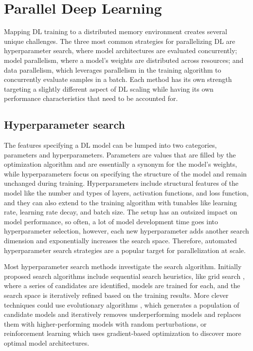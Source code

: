 \section{Parallel Deep Learning}
Mapping DL training to a distributed memory environment creates several unique challenges.
The three most common strategies for parallelizing DL are hyperparameter search, where model architectures are evaluated concurrently; model parallelism, where a model's weights are distributed across resources; and data parallelism, which leverages parallelism in the training algorithm to concurrently evaluate samples in a batch.
Each method has its own strength targeting a slightly different aspect of DL scaling while having its own performance characteristics that need to be accounted for.

\subsection{Hyperparameter search}
The features specifying a DL model can be lumped into two categories, parameters and hyperparameters.
Parameters are values that are filled by the optimization algorithm and are essentially a synonym for the model's weights, while hyperparameters focus on specifying the structure of the model and remain unchanged during training.
Hyperparameters include structural features of the model like the number and types of layers, activation functions, and loss function, and they can also extend to the training algorithm with tunables like learning rate, learning rate decay, and batch size.
The setup has an outsized impact on model performance, so often, a lot of model development time goes into hyperparameter selection, however, each new hyperparameter adds another search dimension and exponentially increases the search space.
Therefore, automated hyperparameter search strategies are a popular target for parallelization at scale.

Most hyperparameter search methods investigate the search algorithm. 
Initially proposed search algorithms include sequential search heuristics, like grid search \cite{Hadjis2016Omnivore}, where a series of candidates are identified, models are trained for each, and the search space is iteratively refined based on the training results.
More clever techniques could use evolutionary algorithms \cite{Young2017EvolveNLWithHPC, Real2017LargeScaleEvolutionOfCV}, which generates a population of candidate models and iteratively removes underperforming models and replaces them with higher-performing models with random perturbations, or reinforcement learning \cite{Zoph2017NeuralArchSearchReinformceLearn} which uses gradient-based optimization to discover more optimal model architectures.

